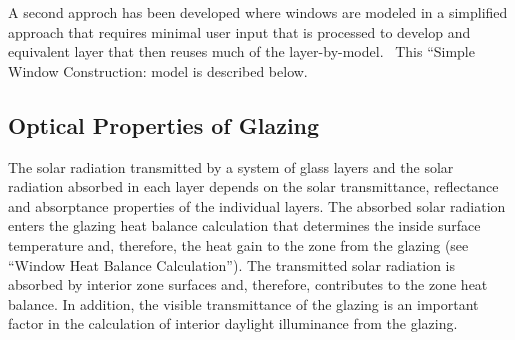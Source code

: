 A second approch has been developed where windows are modeled in a simplified approach that requires minimal user input that is processed to develop and equivalent layer that then reuses much of the layer-by-model.~ This ``Simple Window Construction: model is described below.

\subsection{Optical Properties of Glazing}\label{optical-properties-of-glazing}

The solar radiation transmitted by a system of glass layers and the solar radiation absorbed in each layer depends on the solar transmittance, reflectance and absorptance properties of the individual layers. The absorbed solar radiation enters the glazing heat balance calculation that determines the inside surface temperature and, therefore, the heat gain to the zone from the glazing (see ``Window Heat Balance Calculation''). The transmitted solar radiation is absorbed by interior zone surfaces and, therefore, contributes to the zone heat balance. In addition, the visible transmittance of the glazing is an important factor in the calculation of interior daylight illuminance from the glazing.

